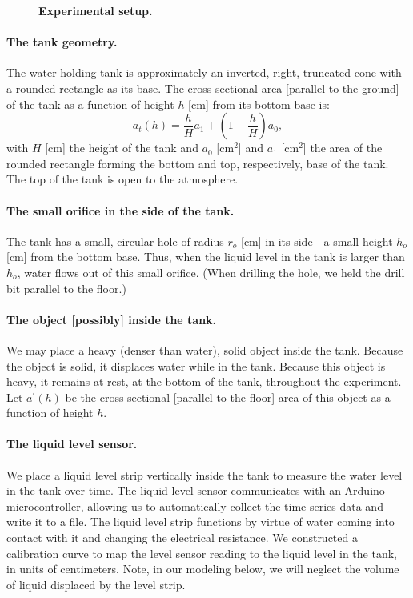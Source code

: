 \documentclass[openacc]{rsproca_new}%
\begin{document}
\begin{figure}[h!]
\begin{center}
	\caption{\textbf{Experimental setup.}}
	\label{fig:photo_of_tank}
\end{center}
\end{figure}

\paragraph{The tank geometry.} The water-holding tank is approximately an inverted, right, truncated cone with a rounded rectangle as its base. The cross-sectional area [parallel to the ground] of the tank as a function of height $h$ [cm] from its bottom base is:
\begin{equation}
	a_t(h) = \frac{h}{H}a_1 + \left(1-\frac{h}{H}\right) a_0,
\end{equation}
with $H$ [cm] the height of the tank and $a_0$ [cm$^2$] and $a_1$ [cm$^2$] the area of the rounded rectangle forming the bottom and top, respectively, base of the tank.
The top of the tank is open to the atmosphere. 

\paragraph{The small orifice in the side of the tank.} The tank has a small, circular hole of radius $r_o$ [cm] in its side---a small height $h_o$ [cm] from the bottom base.
Thus, when the liquid level in the tank is larger than $h_o$, water flows out of this small orifice.
(When drilling the hole, we held the drill bit parallel to the floor.) 

\paragraph{The object [possibly] inside the tank.} We may place a heavy (denser than water), solid object inside the tank. Because the object is solid, it displaces water while in the tank. Because this object is heavy, it remains at rest, at the bottom of the tank, throughout the experiment. Let $a^\prime(h)$ be the cross-sectional [parallel to the floor] area of this object as a function of height $h$.

\paragraph{The liquid level sensor.} We place a liquid level strip vertically inside the tank to measure the water level in the tank over time. The liquid level sensor communicates with an Arduino microcontroller, allowing us to automatically collect the time series data and write it to a file. The liquid level strip functions by virtue of water coming into contact with it and changing the electrical resistance. 
We constructed a calibration curve to map the level sensor reading to the liquid level in the tank, in units of centimeters. 
Note, in our modeling below, we will neglect the volume of liquid displaced by the level strip.
\end{document}
